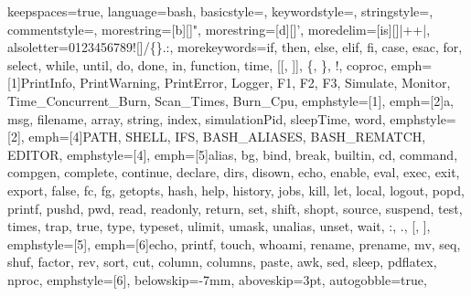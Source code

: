 {%
keepspaces=true,                    %
language=bash,
basicstyle=\ttfamily\small\color{basic-color},
keywordstyle=\color{keywords-color},
stringstyle=\color{strings-color},
commentstyle=\color{comment-color},
morestring=[b][\color{strings-color}]{"},
morestring=[d][\color{strings-color}]{'},
moredelim=[is][\color{basic-color}]{|+}{+|}, %
alsoletter=0123456789![]/\{\}.:, %
morekeywords={if, then, else, elif, fi, case, esac, for, select, while, until, do, done, in, function, time, [[, ]], \{, \}, !, coproc}, %
emph=[1]{PrintInfo, PrintWarning, PrintError, Logger, F1, F2, F3, Simulate, Monitor,
         Time_Concurrent_Burn, Scan_Times, Burn_Cpu},
emphstyle=[1]{\color{functions-color}}, %
emph=[2]{a, msg, filename, array, string, index, simulationPid, sleepTime, word},
emphstyle=[2]{\color{variables-color}}, %
emph=[4]{PATH, SHELL, IFS, BASH_ALIASES, BASH_REMATCH, EDITOR},
emphstyle=[4]{\color{environment-color}}, %
emph=[5]{alias, bg, bind, break, builtin, cd, command, compgen, complete, continue, declare, dirs, disown, echo, enable, eval,
         exec, exit, export, false, fc, fg, getopts, hash, help, history, jobs, kill, let, local, logout, popd, printf, pushd, pwd,
         read, readonly, return, set, shift, shopt, source, suspend, test, times, trap, true, type, typeset, ulimit, umask,
         unalias, unset, wait, :, ., [, ]},
emphstyle=[5]{\color{builtins-color}}, %
emph=[6]{echo, printf, touch, whoami, rename, prename, mv, seq, shuf, factor, rev, sort, cut, column, columns, paste,
         awk, sed, sleep, pdflatex, nproc},
emphstyle=[6]{\color{external-color}}, %
%
belowskip=-7mm,
aboveskip=3pt,
autogobble=true, %
}

\def\bash{\lstinline[style=MyBash, basicstyle=\ttfamily\color{black}]}

